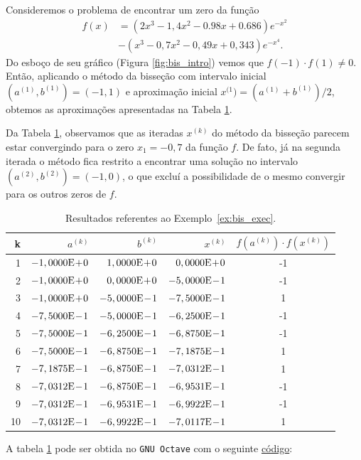\begin{ex}\label{ex:bis_exec}
  Consideremos o problema de encontrar um zero da função
  \begin{align}
  f(x) &= (2x^3-1,4x^2-0.98x+0.686)e^{-x^2} \nonumber\\
       &- (x^3-0,7x^2-0,49x+0,343)e^{-x^4}.
  \end{align}
Do esboço de seu gráfico (Figura \ref{fig:bis_intro}) vemos que $f(-1)\cdot f(1) \neq 0$. Então, aplicando o método da bisseção com intervalo inicial $(a^{(1)}, b^{(1)}) = (-1, 1)$ e aproximação inicial $x^{(1}) = (a^{(1)}+b^{(1)})/2$, obtemos as aproximações apresentadas na Tabela \ref{tab:bis_exec}.

Da Tabela \ref{tab:bis_exec}, observamos que as iteradas $x^{(k)}$ do método da bisseção parecem estar convergindo para o zero $x_1 = -0,7$ da função $f$. De fato, já na segunda iterada o método fica restrito a encontrar uma solução no intervalo $(a^{(2)}, b^{(2)}) = (-1, 0)$, o que excluí a possibilidade de o mesmo convergir para os outros zeros de $f$.

\begin{table}[h!]
  \centering
  \caption{Resultados referentes ao Exemplo~\ref{ex:bis_exec}.}
  \begin{tabular}{r|rr|r|c}
    k & $a^{(k)}$ & $b^{(k)}$ & $x^{(k)}$ & $f(a^{(k)})\cdot f(x^{(k)})$\\\hline
    1 & $-1,0000\mathrm{E}\!+\!0$ & $1,0000\mathrm{E}\!+\!0$ & $0,0000\mathrm{E}\!+\!0$ & -1 \\
    2 & $-1,0000\mathrm{E}\!+\!0$ & $0,0000\mathrm{E}\!+\!0$ & $-5,0000\mathrm{E}\!-\!1$ & -1 \\
    3 & $-1,0000\mathrm{E}\!+\!0$ & $-5,0000\mathrm{E}\!-\!1$ & $-7,5000\mathrm{E}\!-\!1$ & 1 \\
    4 & $-7,5000\mathrm{E}\!-\!1$ & $-5,0000\mathrm{E}\!-\!1$ & $-6,2500\mathrm{E}\!-\!1$ &  -1 \\
    5 & $-7,5000\mathrm{E}\!-\!1$ & $-6,2500\mathrm{E}\!-\!1$ & $-6,8750\mathrm{E}\!-\!1$ &  -1 \\
    6 & $-7,5000\mathrm{E}\!-\!1$ & $-6,8750\mathrm{E}\!-\!1$ & $-7,1875\mathrm{E}\!-\!1$ &  1 \\
    7 & $-7,1875\mathrm{E}\!-\!1$ & $-6,8750\mathrm{E}\!-\!1$ & $-7,0312\mathrm{E}\!-\!1$ & 1 \\
    8 & $-7,0312\mathrm{E}\!-\!1$ & $-6,8750\mathrm{E}\!-\!1$ & $-6,9531\mathrm{E}\!-\!1$ & -1 \\
    9 & $-7,0312\mathrm{E}\!-\!1$ & $-6,9531\mathrm{E}\!-\!1$ & $-6,9922\mathrm{E}\!-\!1$ & -1 \\
    10 & $-7,0312\mathrm{E}\!-\!1$ & $-6,9922\mathrm{E}\!-\!1$ & $-7,0117\mathrm{E}\!-\!1$ & 1 \\\hline
  \end{tabular}
  \label{tab:bis_exec}
\end{table}

\ifisoctave
A tabela \ref{tab:bis_exec} pode ser obtida no \verb+GNU Octave+ com o seguinte \href{https://github.com/phkonzen/notas/blob/master/src/MatematicaNumerica/cap_eq1d/dados/ex_bis_exec/ex_bis_exec.m}{código}:

\fi
\end{ex}

